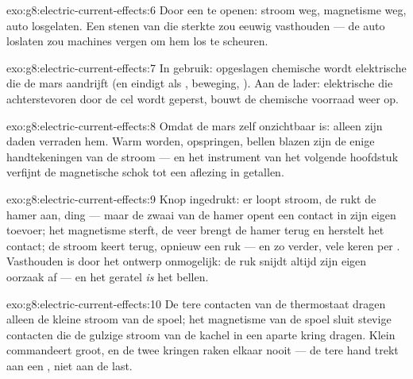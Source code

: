 \begin{solution}{exo:g8:electric-current-effects:6}
Door een  te openen: stroom weg, magnetisme weg, auto
losgelaten. Een stenen  van die sterkte zou eeuwig
vasthouden --- de auto loslaten zou machines vergen om hem los te
scheuren.
\end{solution}

\begin{solution}{exo:g8:electric-current-effects:7}
In gebruik: opgeslagen chemische  wordt elektrische
 die de mars aandrijft (en eindigt als
, beweging, ). Aan de lader: elektrische
 die achterstevoren door de cel wordt geperst, bouwt de
chemische voorraad weer op.
\end{solution}

\begin{solution}{exo:g8:electric-current-effects:8}
Omdat de mars zelf onzichtbaar is: alleen zijn daden verraden hem.
Warm worden, opspringen, bellen blazen zijn de enige handtekeningen van
de stroom --- en het instrument van het volgende hoofdstuk verfijnt de
magnetische schok tot een aflezing in getallen.
\end{solution}

\begin{solution}{exo:g8:electric-current-effects:9}
Knop ingedrukt: er loopt stroom, de  rukt de hamer
aan, ding --- maar de zwaai van de hamer opent een contact in zijn eigen
toevoer; het magnetisme sterft, de veer brengt de hamer terug en
herstelt het contact; de stroom keert terug, opnieuw een ruk --- en zo
verder, vele keren per . Vasthouden is door het ontwerp
onmogelijk: de ruk snijdt altijd zijn eigen oorzaak af --- en het
geratel \emph{is} het bellen.
\end{solution}

\begin{solution}{exo:g8:electric-current-effects:10}
De tere contacten van de thermostaat dragen alleen de kleine stroom van
de spoel; het magnetisme van de spoel sluit stevige contacten die de
gulzige stroom van de kachel in een aparte kring dragen. Klein
commandeert groot, en de twee kringen raken elkaar nooit --- de tere
hand trekt aan een , niet aan de last.
\end{solution}

